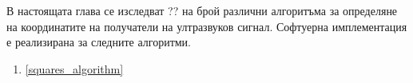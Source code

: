 В настоящата глава се изследват ?? на брой различни алгоритъма за определяне на координатите на получатели на ултразвуков сигнал. Софтуерна имплементация е реализирана за следните алгоритми. \begin{enumerate}
    \item \ref{squares_algorithm}
\end{enumerate}



\pagebreak



\pagebreak



\pagebreak



\pagebreak



\pagebreak


\pagebreak


\pagebreak